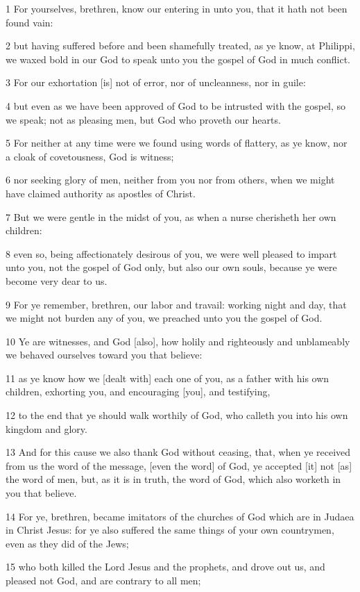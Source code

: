 \par 1 For yourselves, brethren, know our entering in unto you, that it hath not been found vain:
\par 2 but having suffered before and been shamefully treated, as ye know, at Philippi, we waxed bold in our God to speak unto you the gospel of God in much conflict.
\par 3 For our exhortation [is] not of error, nor of uncleanness, nor in guile:
\par 4 but even as we have been approved of God to be intrusted with the gospel, so we speak; not as pleasing men, but God who proveth our hearts.
\par 5 For neither at any time were we found using words of flattery, as ye know, nor a cloak of covetousness, God is witness;
\par 6 nor seeking glory of men, neither from you nor from others, when we might have claimed authority as apostles of Christ.
\par 7 But we were gentle in the midst of you, as when a nurse cherisheth her own children:
\par 8 even so, being affectionately desirous of you, we were well pleased to impart unto you, not the gospel of God only, but also our own souls, because ye were become very dear to us.
\par 9 For ye remember, brethren, our labor and travail: working night and day, that we might not burden any of you, we preached unto you the gospel of God.
\par 10 Ye are witnesses, and God [also], how holily and righteously and unblameably we behaved ourselves toward you that believe:
\par 11 as ye know how we [dealt with] each one of you, as a father with his own children, exhorting you, and encouraging [you], and testifying,
\par 12 to the end that ye should walk worthily of God, who calleth you into his own kingdom and glory.
\par 13 And for this cause we also thank God without ceasing, that, when ye received from us the word of the message, [even the word] of God, ye accepted [it] not [as] the word of men, but, as it is in truth, the word of God, which also worketh in you that believe.
\par 14 For ye, brethren, became imitators of the churches of God which are in Judaea in Christ Jesus: for ye also suffered the same things of your own countrymen, even as they did of the Jews;
\par 15 who both killed the Lord Jesus and the prophets, and drove out us, and pleased not God, and are contrary to all men;
